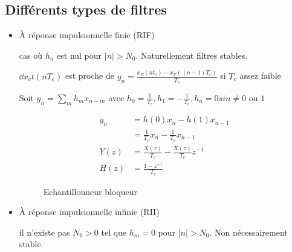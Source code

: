 \documentclass[main.tex]{subfiles}
\begin{document}
\subsection{Différents types de filtres}
\begin{itemize}
\item À réponse impulsionnelle finie (RIF)

  cas où $h_n$ est nul pour $|n| > N_0$. Naturellement filtres stables.

\begin{exemple}

$\dd{x_c}{t}(nT_e)$ est proche de $y_n = \frac{x_E(nt_e)-x_E((n-1)T_e)}{T_e}$ si $T_e$ assez faible

Soit $y_n = \sum_m h_m x_{n-m}$ avec $h_0 = \frac{1}{T_e}, h_1 = -\frac{1}{T_e}, h_n = 0 si n\neq 0 \text{ ou } 1$

\begin{align*}
y_n & = h(0)x_n - h(1)x_{n-1} \\
& = \frac{1}{T_e} x_n - \frac{1}{T_e} x_{n-1} \\
Y(z) &= \frac{X(z)}{T_e} - \frac{X(z)}{T_e}z^{-1} \\
H(z) & = \frac{1-z^{-1}}{T_e}
\end{align*}
\begin{figure}[H]
  \centering
  \caption{Echantillonneur bloqueur}
\end{figure}
\end{exemple}

\item À réponse impulsionnelle infinie (RII)

  il n'existe pas $N_0 > 0$ tel que $h_m=0$ pour $|n| > N_0$. Non nécessairement stable.


\end{itemize}
\end{document}
